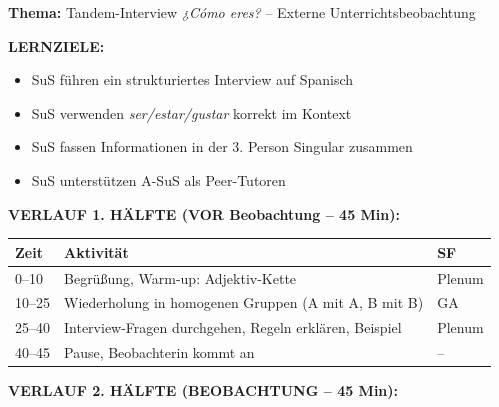 \documentclass[11pt, a4paper]{article}
\newcommand{\es}[1]{\textcolor{spanisch}{\textit{#1}}}
\begin{document}
\begin{beobachtungsbox}[title={DS 10 -- BEOBACHTUNGSSTUNDE (Di, 03.02.2026)}]

\textbf{Thema:} Tandem-Interview \es{¿Cómo eres?} -- Externe Unterrichtsbeobachtung

\vspace{0.3cm}


\vspace{0.3cm}

\textbf{LERNZIELE:}
\begin{itemize}[leftmargin=1.5em, nosep]
    \item[Alle:] SuS führen ein strukturiertes Interview auf Spanisch
    \item[Alle:] SuS verwenden \es{ser/estar/gustar} korrekt im Kontext
    \item[\textcolor{gruppeB}{B:}] SuS fassen Informationen in der 3. Person Singular zusammen
    \item[\textcolor{gruppeB}{B:}] SuS unterstützen A-SuS als Peer-Tutoren
\end{itemize}

\vspace{0.2cm}

\textbf{VERLAUF 1. HÄLFTE (VOR Beobachtung -- 45 Min):}

\begin{tabular}{|p{1.2cm}|p{9cm}|p{3.5cm}|}
\hline
\rowcolor{hellgrau}
\textbf{Zeit} & \textbf{Aktivität} & \textbf{SF} \\
\hline
0--10 & Begrüßung, Warm-up: Adjektiv-Kette & Plenum \\
\hline
10--25 & Wiederholung in homogenen Gruppen (A mit A, B mit B) & GA \\
\hline
25--40 & Interview-Fragen durchgehen, Regeln erklären, Beispiel & Plenum \\
\hline
40--45 & Pause, Beobachterin kommt an & -- \\
\hline
\end{tabular}

\vspace{0.2cm}

\textbf{VERLAUF 2. HÄLFTE (BEOBACHTUNG -- 45 Min):}


\end{beobachtungsbox}
\end{document}
